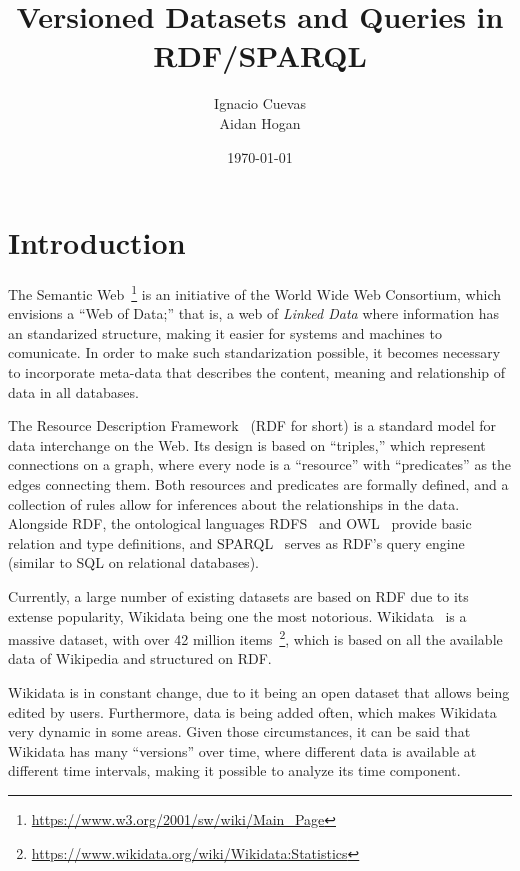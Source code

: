 \documentclass[11pt, titlepage]{article}
\begin{document}
\title{\Huge{Versioned Datasets and Queries in RDF/SPARQL}}
\author{Ignacio Cuevas\\ Aidan Hogan}
\date{\today}
\maketitle
\newpage
\section{Introduction}
The Semantic Web~\footnote{\url{https://www.w3.org/2001/sw/wiki/Main_Page}} is an initiative of the World Wide Web Consortium, which envisions a ``Web of Data;'' that is, a web of \textit{Linked Data} where information has an standarized structure, making it easier for systems and machines to comunicate. In order to make such standarization possible, it becomes necessary to incorporate meta-data that describes the content, meaning and relationship of data in all databases.


The Resource Description Framework~\cite{key:rdfprimer11} (RDF for short) is a standard model for data interchange on the Web. Its design is based on ``triples,'' which represent connections on a graph, where every node is a ``resource'' with ``predicates'' as the edges connecting them. Both resources and predicates are formally defined, and a collection of rules allow for inferences about the relationships in the data.
Alongside RDF, the ontological languages RDFS~\cite{key:rdfschema11} and OWL~\cite{key:owl2primer} provide basic relation and type definitions, and SPARQL~\cite{key:sparql11} serves as RDF's query engine (similar to SQL on relational databases).


Currently, a large number of existing datasets are based on RDF due to its extense popularity, Wikidata being one the most notorious. Wikidata~\cite{VrandecicK14} is a massive dataset, with over 42 million items~\footnote{\url{https://www.wikidata.org/wiki/Wikidata:Statistics}}, which is based on all the available data of Wikipedia and structured on RDF.


Wikidata is in constant change, due to it being an open dataset that allows being edited by users. Furthermore, data is being added often, which makes Wikidata very dynamic in some areas. Given those circumstances, it can be said that Wikidata has many ``versions'' over time, where different data is available at different time intervals, making it possible to analyze its time component.
\end{document}
